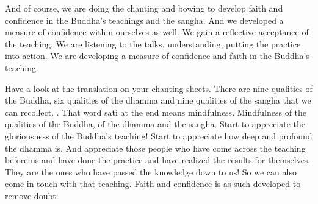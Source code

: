 \documentclass[letterpaper,10pt,english]{sphinxmanual}
\begin{document}
\sphinxAtStartPar
And of course, we are doing the chanting and bowing to develop faith
and confidence in the Buddha’s teachings and the sangha. And we developed
  a measure of confidence within ourselves as well. We gain a reflective acceptance of the teaching. We are listening to the talks, understanding, putting
the practice into action. We are developing a measure of confidence and faith
in the Buddha’s teaching.

\sphinxAtStartPar
Have a look at the translation on your chanting sheets. There are nine
qualities of the Buddha, six qualities of the dhamma and nine qualities of the
sangha that we can recollect.
.
That word sati at the end means mindfulness. Mindfulness of the qualities of
the Buddha, of the dhamma and the sangha. Start to appreciate the gloriousness of the Buddha’s teaching! Start to appreciate how deep and profound
the  dhamma  is.  And  appreciate  those  people  who  have  come  across  the
teaching before us and have done the practice and have realized the results
for themselves. They are the ones who have passed the knowledge down to
us! So we can also come in touch with that teaching. Faith and confidence is
as such developed to remove doubt.
\end{document}
